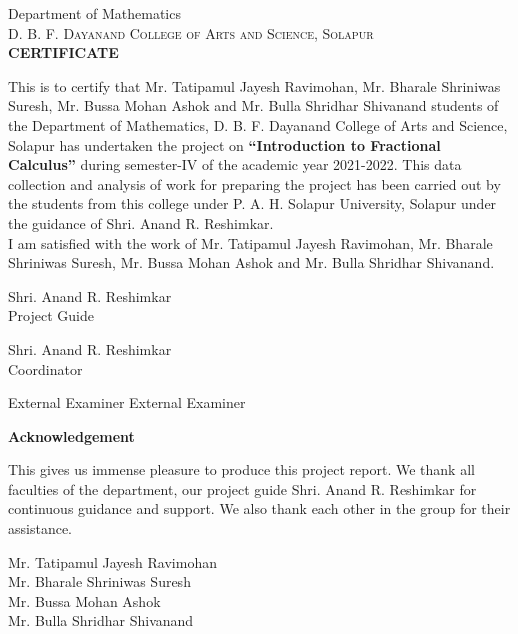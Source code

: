 \documentclass[a4paper,14pt,oneside]{book}
\theoremstyle{plain}
\theoremstyle{definition}
\theoremstyle{remark}
\begin{document}
\begin{titlepage}
\begin{center}
\newpage
\begin{center}
\huge{Department of Mathematics}\\[1cm]
\normalsize
\textsc{\Large{D. B. F. Dayanand College of Arts and Science, Solapur}}\\[2.0cm]
\textbf{\Large CERTIFICATE}\\
\end{center}
\Large
\justify
This is to certify that Mr. Tatipamul Jayesh Ravimohan, Mr. Bharale Shriniwas Suresh, Mr. Bussa Mohan Ashok and Mr. Bulla Shridhar Shivanand students of the Department of Mathematics, D. B. F. Dayanand College of Arts and Science, Solapur has undertaken the project on \textbf{\enquote{Introduction to Fractional Calculus}} during semester-IV of the academic year 2021-2022. This data collection and analysis of work for preparing the project has been carried out by the students from this college under P. A. H. Solapur University, Solapur under the guidance of Shri. Anand R. Reshimkar.\\
\indent I am satisfied with the work of  Mr. Tatipamul Jayesh Ravimohan,  Mr. Bharale Shriniwas Suresh, Mr. Bussa Mohan Ashok and Mr. Bulla Shridhar Shivanand.\\
\vfill
\begin{minipage}{3in}
Shri. Anand R. Reshimkar\\\hspace{1.6cm}Project Guide 
\end{minipage}\hspace{2cm}
\begin{minipage}{3in}
Shri. Anand R. Reshimkar\\\hspace{1.6cm}Coordinator
\end{minipage}
\vspace*{3cm}
\begin{center}
\hspace{1.1cm}External Examiner \hspace*{5.2cm} External Examiner
\end{center}

\newpage
\vspace*{4cm}
\begin{center}\textbf{Acknowledgement}
\end{center}\justify
\Large{
This gives us immense pleasure to produce this project report. We thank all faculties of the department, our project guide Shri. Anand R. Reshimkar for continuous guidance and support. We also thank each other in the group for their assistance.\\
\begin{flushright}
Mr. Tatipamul Jayesh Ravimohan \\
Mr. Bharale Shriniwas Suresh \\
Mr. Bussa Mohan Ashok \\
Mr. Bulla Shridhar Shivanand \\
\end{flushright}}


\end{center}
\end{titlepage}
\end{document}

